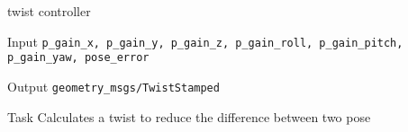 \begin{frame}{twist controller}
	\begin{alertblock}{Input}
	\texttt{p\_gain\_x, p\_gain\_y, p\_gain\_z, p\_gain\_roll, p\_gain\_pitch, p\_gain\_yaw, pose\_error}
    \end{alertblock}
    
    \begin{alertblock}{Output}
	\texttt{geometry\_msgs/TwistStamped}
    \end{alertblock}
    
    \begin{alertblock}{Task}
   Calculates a twist to reduce the difference between two pose
    \end{alertblock}
\end{frame}

